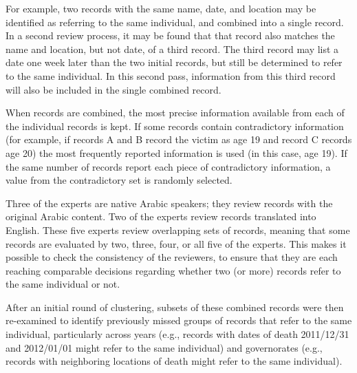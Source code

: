 \documentclass{imsart}
\begin{document}
For example, two records with the same name, date, and location may be identified as referring to the same individual, and combined into a single record. In a second review process, it may be found that that record also matches the name and location, but not date, of a third record. The third record may list a date one week later than the two initial records, but still be determined to refer to the same individual. In this second pass, information from this third record will also be included in the single combined record.

When records are combined, the most precise information available from each of the individual records is kept. If some records contain contradictory information (for example, if records A and B record the victim as age 19 and record C records age 20) the most frequently reported information is used (in this case, age 19). If the same number of records report each piece of contradictory information, a value from the contradictory set is randomly selected.

Three of the experts are native Arabic speakers; they review records with the original Arabic content. Two of the experts review records translated into English. These five experts review overlapping sets of records, meaning that some records are evaluated by two, three, four, or all five of the experts. This makes it possible to check the consistency of the reviewers, to ensure that they are each reaching comparable decisions regarding whether two (or more) records refer to the same individual or not.

After an initial round of clustering, subsets of these combined records were then re-examined to identify previously missed groups of records that refer to the same individual, particularly across years (e.g., records with dates of death 2011/12/31 and 2012/01/01 might refer to the same individual) and governorates (e.g., records with neighboring locations of death might refer to the same individual).
\end{document}
